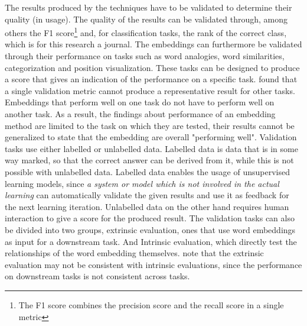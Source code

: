 \documentclass[../../Thesis.tex]{subfiles}
\begin{document}
The results produced by the techniques have to be validated to determine their quality (in usage). The quality of the results can be validated through, among others the F1 score\footnote{The F1 score combines the precision score and the recall score in a single metric} and, for classification tasks, the rank of the correct class, which is for this research a journal. The embeddings can furthermore be validated through their performance on tasks such as word analogies, word similarities, categorization and position visualization. These tasks can be designed to produce a score that gives an indication of the performance on a specific task. \citet{schnabel2015evaluation} found that a single validation metric cannot produce a representative result for other tasks. Embeddings that perform well on one task do not have to perform well on another task. As a result, the findings about performance of an embedding method are limited to the task on which they are tested, their results cannot be generalized to state that the embedding are overall "performing well". Validation tasks use either labelled or unlabelled data. Labelled data is data that is in some way marked, so that the correct answer can be derived from it, while this is not possible with unlabelled data. Labelled data enables the usage of unsupervised learning models, since  \textit{a system or model which is not involved in the actual learning} can automatically validate the given results and use it as feedback for the next learning iteration. Unlabelled data on the other hand requires human interaction to give a score for the produced result. The validation tasks can also be divided into two groups, extrinsic evaluation, ones that use word embeddings as input for a downstream task. And Intrinsic evaluation, which directly test the relationships of the word embedding themselves. \citet{schnabel2015evaluation} note that the extrinsic evaluation may not be consistent with intrinsic evaluations, since the performance on downstream tasks is not consistent across tasks.
\end{document}
